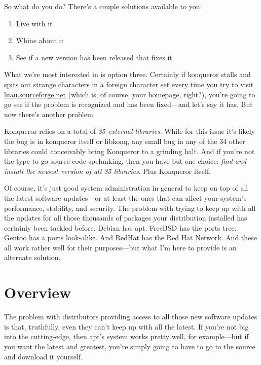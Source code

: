 \documentclass{report}
\begin{document}
So what do you do?  There's a couple solutions available to you:

\begin{enumerate}
\item Live with it
\item Whine about it
\item See if a new version has been released that fixes it
\end{enumerate}

What we're most interested in is option three.  Certainly if konqueror stalls
and spits out strange characters in a foreign character set every time you try
to visit \href{http://luau.sourceforge.net}{luau.sourceforge.net} (which is, of
course, your homepage, right?), you're going to go see if the problem is
recognized and has been fixed---and let's say it has.  But now there's another
problem.

Konqueror relies on a total of \emph{35 external libraries}.  While for this issue it's likely the bug is in konqueror itself or libkonq, any small bug in any of the 34 other libraries could conceivably bring Konqueror to a grinding halt.  And if you're not the type to go source code spelunking, then you have but one choice: \emph{find and install the newest version of all 35 libraries}.  Plus Konqueror itself.

Of course, it's just good system administration in general to keep on top of all
the latest software updates---or at least the ones that can affect your system's
performance, stability, and security.  The problem with trying to keep up with
all the updates for all those thousands of packages your distribution installed
has certainly been tackled before.  Debian has apt.  FreeBSD has the ports tree.
Gentoo has a ports look-alike.  And RedHat has the Red Hat Network.  And these
all work rather well for their purposes---but what I'm here to provide is an
alternate solution.

\section{Overview}

The problem with distributors providing access to all those new software updates is that, truthfully, even they can't keep up with all the latest.  If you're not big into the cutting-edge, then apt's system works pretty well, for example---but if you want the latest and greatest, you're simply going to have to go to the source and download it yourself.
\end{document}
